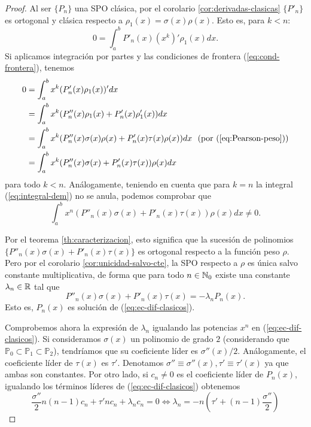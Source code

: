 \begin{proof}
    Al ser $\{P_n\}$ una SPO clásica, por el corolario \ref{cor:derivadas-clasicas} $\{P'_n\}$ es ortogonal y clásica respecto a $\rho_1(x)=\sigma(x)\rho(x)$. Esto es, para $k<n$:
    \begin{equation}
        \label{eq:integral-dem}
        0=\int_a^b P'_n(x)(x^k)' \rho_1(x)dx.
    \end{equation}
    Si aplicamos integración por partes y las condiciones de frontera (\ref{eq:cond-frontera}), tenemos
    \begin{equation*}
        \begin{split}
            0&= \int_a^b x^k (P'_n(x) \rho_1(x))'dx \\
            &= \int_a^b x^k (P''_n(x) \rho_1(x)+P'_n(x)\rho_1'(x))dx  \\
            &= \int_a^b x^k (P''_n(x)\sigma(x)\rho(x)+P'_n(x)\tau(x)\rho(x))dx \ \ \text{(por (\ref{eq:Pearson-peso}))}  \\
            &= \int_a^b x^k (P''_n(x)\sigma(x)+P'_n(x)\tau(x))\rho(x)dx
        \end{split}
    \end{equation*}
    para todo $k<n$. Análogamente, teniendo en cuenta que para $k=n$ la integral (\ref{eq:integral-dem}) no se anula, podemos comprobar que
    $$
    \int_a^b x^n (P''_n(x)\sigma(x)+P'_n(x)\tau(x))\rho(x)dx  \neq 0.
    $$
    
    Por el teorema \ref{th:caracterizacion}, esto significa que la sucesión de polinomios $\{P''_n(x)\sigma(x)+P'_n(x)\tau(x)\}$ es ortogonal respecto a la función peso $\rho$. Pero por el corolario \ref{cor:unicidad-salvo-cte}, la SPO respecto a $\rho$ es única salvo constante multiplicativa, de forma que para todo $n\in\mathbb{N}_0$ existe una constante $\lambda_n\in\mathbb{R}$ tal que
    $$
    P''_n(x)\sigma(x)+P'_n(x)\tau(x) = -\lambda_n P_n(x).
    $$
    Esto es, $P_n(x)$ es solución de (\ref{eq:ec-dif-clasicos}).

    Comprobemos ahora la expresión de $\lambda_n$ igualando las potencias $x^n$ en (\ref{eq:ec-dif-clasicos}). Si consideramos $\sigma(x)$ un polinomio de grado $2$ (considerando que $\mathbb P_0\subset\mathbb P_1\subset \mathbb{P}_2$), tendríamos que su coeficiente líder es $\sigma''(x)/2$. Análogamente, el coeficiente líder de $\tau(x)$ es $\tau'$. Denotamos $\sigma'' \equiv \sigma''(x), \tau'\equiv\tau'(x)$ ya que ambas son constantes. Por otro lado, si $c_n\neq 0$ es el coeficiente líder de $P_n(x)$, igualando los términos líderes de (\ref{eq:ec-dif-clasicos}) obtenemos
    $$
    \dfrac {\sigma''} 2 n (n-1) c_n + \tau' n c_n + \lambda_n c_n = 0 \Leftrightarrow \lambda_n = -n\left(\tau' + (n-1)\dfrac{\sigma''}{2}\right)
    $$
\end{proof}

